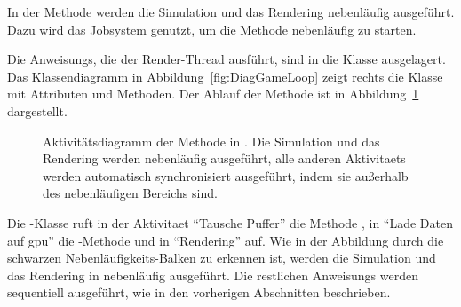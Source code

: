 In der Methode  werden die Simulation und das Rendering nebenläufig ausgeführt. Dazu wird das Jobsystem genutzt, um die Methode  nebenläufig zu starten. 

Die \glspl{Anweisung}, die der Render-Thread ausführt, sind in die Klasse  ausgelagert. Das Klassendiagramm in Abbildung~\ref{fig:DiagGameLoop} zeigt rechts die Klasse  mit Attributen und Methoden. Der Ablauf der Methode  ist in Abbildung~\ref{fig:stepWindowActivity} dargestellt.
\begin{figure}
	\centering
	
	\caption[Aktivitätsdiagramm der Methode  in .]{Aktivitätsdiagramm der Methode  in . Die Simulation und das Rendering werden nebenläufig ausgeführt, alle anderen \glspl{Aktivitaet} werden automatisch synchronisiert ausgeführt, indem sie außerhalb des nebenläufigen Bereichs sind.}\label{fig:stepWindowActivity}
\end{figure}
Die -Klasse ruft in der \gls{Aktivitaet} \enquote{Tausche Puffer} die Methode , in \enquote{Lade Daten auf \ac{gpu}} die -Methode und in \enquote{Rendering}  auf. Wie in der Abbildung durch die schwarzen Nebenläufigkeits-Balken zu erkennen ist, werden die Simulation und das Rendering in  nebenläufig ausgeführt. Die restlichen \glspl{Anweisung} werden sequentiell ausgeführt, wie in den vorherigen Abschnitten beschrieben.